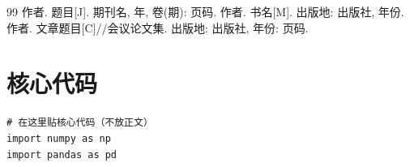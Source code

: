 \documentclass[12pt]{article}
\begin{document}
\begin{thebibliography}{99}
 作者. 题目[J]. 期刊名, 年, 卷(期): 页码.
 作者. 书名[M]. 出版地: 出版社, 年份.
 作者. 文章题目[C]//会议论文集. 出版地: 出版社, 年份: 页码.
\end{thebibliography}

\appendix
\section{核心代码}
\begin{lstlisting}
# 在这里贴核心代码（不放正文）
import numpy as np
import pandas as pd
\end{lstlisting}
\end{document}
